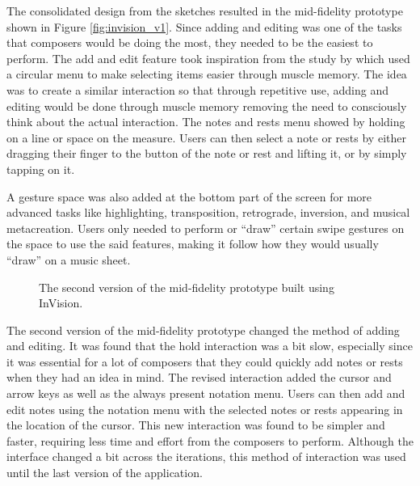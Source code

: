 			The consolidated design from the sketches resulted in the mid-fidelity prototype shown in Figure \ref{fig:invision_v1}. Since adding and editing was one of the tasks that composers would be doing the most, they needed to be the easiest to perform. The add and edit feature took inspiration from the study by \citet{zhao2007earpod} which used a circular menu to make selecting items easier through muscle memory. The idea was to create a similar interaction so that through repetitive use, adding and editing would be done through muscle memory removing the need to consciously think about the actual interaction. The notes and rests menu showed by holding on a line or space on the measure. Users can then select a note or rests by either dragging their finger to the button of the note or rest and lifting it, or by simply tapping on it. 

			A gesture space was also added at the bottom part of the screen for more advanced tasks like highlighting, transposition, retrograde, inversion, and musical metacreation. Users only needed to perform or ``draw'' certain swipe gestures on the space to use the said features, making it follow how they would usually ``draw'' on a music sheet. 

			\begin{figure}[H]
				\centering
			    \caption{The second version of the mid-fidelity prototype built using InVision.}
			    \label{fig:invision_v2}
			\end{figure} 

			The second version of the mid-fidelity prototype changed the method of adding and editing. It was found that the hold interaction was a bit slow, especially since it was essential for a lot of composers that they could quickly add notes or rests when they had an idea in mind. The revised interaction added the cursor and arrow keys as well as the always present notation menu. Users can then add and edit notes using the notation menu with the selected notes or rests appearing in the location of the cursor. This new interaction was found to be simpler and faster, requiring less time and effort from the composers to perform. Although the interface changed a bit across the iterations, this method of interaction was used until the last version of the application. 

